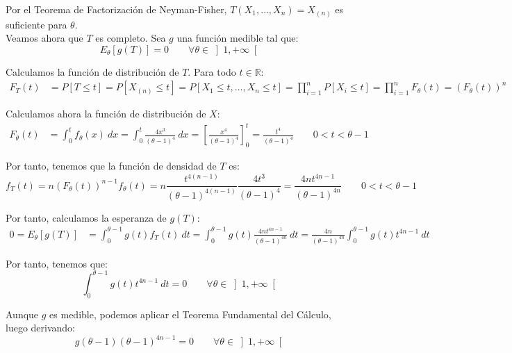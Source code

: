 \begin{ejercicio}[Reto]
    Por el Teorema de Factorización de Neyman-Fisher, $T(X_1, \ldots, X_n) = X_{(n)}$ es suficiente para $\theta$.\\

    Veamos ahora que $T$ es completo. Sea $g$ una función medible tal que:
    \begin{equation*}
        E_\theta[g(T)] = 0 \qquad \forall \theta \in \left]1,+\infty\right[
    \end{equation*}

    Calculamos la función de distribución de $T$. Para todo $t\in \mathbb{R}$:
    \begin{align*}
        F_T(t) &= P[T \leq t] = P[X_{(n)} \leq t] = P[X_1 \leq t, \ldots, X_n \leq t] = \prod_{i=1}^{n} P[X_i \leq t] = \prod_{i=1}^{n} F_\theta(t) = {(F_\theta(t))}^{n}
    \end{align*}

    Calculamos ahora la función de distribución de $X$:
    \begin{align*}
        F_\theta(t) &= \int_{0}^{t} f_\theta(x) ~dx = \int_{0}^{t} \frac{4x^3}{(\theta-1)^4} ~dx = \left[\frac{x^4}{(\theta-1)^4}\right]_{0}^{t} = \frac{t^4}{(\theta-1)^4} \qquad 0<t<\theta-1
    \end{align*}

    Por tanto, tenemos que la función de densidad de $T$ es:
    \begin{equation*}
        f_T(t) = n{(F_\theta(t))}^{n-1}f_\theta(t) = n\frac{t^{4(n-1)}}{(\theta-1)^{4(n-1)}} \frac{4t^3}{(\theta-1)^4} = \frac{4n t^{4n-1}}{(\theta-1)^{4n}} \qquad 0<t<\theta-1
    \end{equation*}

    Por tanto, calculamos la esperanza de $g(T)$:
    \begin{align*}
        0 = E_\theta[g(T)] &= \int_{0}^{\theta-1} g(t) f_T(t) ~dt = \int_{0}^{\theta-1} g(t) \frac{4n t^{4n-1}}{(\theta-1)^{4n}} ~dt = \frac{4n}{(\theta-1)^{4n}} \int_{0}^{\theta-1} g(t) t^{4n-1} ~dt
    \end{align*}

    Por tanto, tenemos que:
    \begin{equation*}
        \int_{0}^{\theta-1} g(t) t^{4n-1} ~dt = 0 \qquad \forall \theta \in \left]1,+\infty\right[
    \end{equation*}

    Aunque $g$ es medible, podemos aplicar el Teorema Fundamental del Cálculo, luego derivando:
    \begin{equation*}
        g(\theta-1) (\theta-1)^{4n-1} = 0 \qquad \forall \theta \in \left]1,+\infty\right[
    \end{equation*}


\end{ejercicio}
